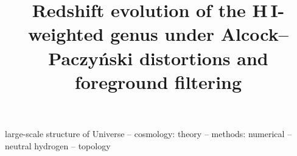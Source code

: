 \documentclass[fleqn,usenatbib]{mnras}
\title[Genus evolution, AP and foreground filtering]{Redshift evolution of the H\,I-weighted genus under Alcock--Paczy\'nski distortions and foreground filtering}
\author{}
\date{}
\begin{document}
\label{firstpage}
\pagerange{\pageref{firstpage}--\pageref{lastpage}}
\maketitle
\begin{abstract}

\end{abstract}
\begin{keywords}
large-scale structure of Universe -- cosmology: theory -- methods: numerical -- neutral hydrogen -- topology
\end{keywords}





\FloatBarrier %






\appendix



\label{lastpage}
\FloatBarrier
\end{document}
